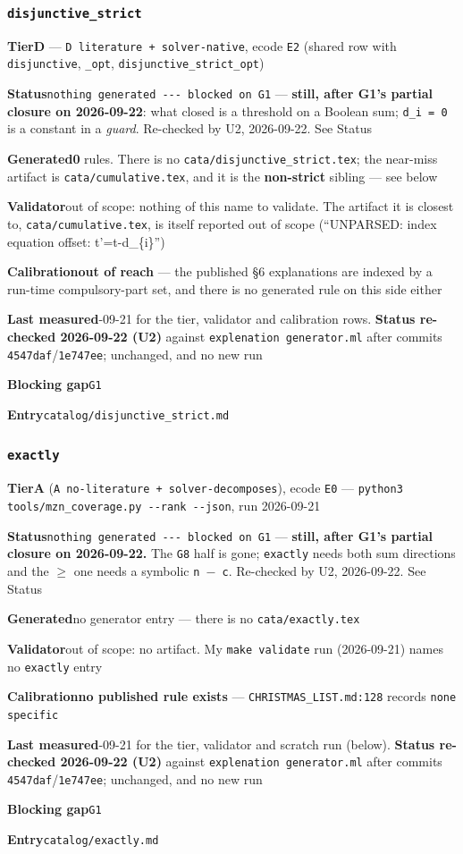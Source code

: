 \documentclass[10pt,a4paper]{article}
\newcommand{\entryfield}[2]{{\raggedright\textbf{#1}\quad #2\par}}
\begin{document}
\subsubsection*{\texttt{disjunctive\_\allowbreak{}strict}}
\label{entry:disjunctive-strict}
\entryfield{Tier}{\textbf{D} --- \texttt{D literature + solver-\allowbreak{}native}, ecode \texttt{E2} (shared row with \texttt{disjunctive}, \texttt{\_opt}, \texttt{disjunctive\_strict\_opt})}
\entryfield{Status}{\texttt{nothing generated -\allowbreak{}-\allowbreak{}-\allowbreak{} blocked on G1} --- \textbf{still, after G1's partial closure on 2026-09-22}: what closed is a threshold on a Boolean sum; \texttt{d\_i = 0} is a constant in a \emph{guard}. Re-checked by U2, 2026-09-22. See Status}
\entryfield{Generated}{\textbf{0} rules. There is no \texttt{cata/\allowbreak{}disjunctive\_\allowbreak{}strict.\allowbreak{}tex}; the near-miss artifact is \texttt{cata/cumulative.tex}, and it is the \textbf{non-strict} sibling --- see below}
\entryfield{Validator}{out of scope: nothing of this name to validate. The artifact it is closest to, \texttt{cata/cumulative.tex}, is itself reported out of scope (``UNPARSED: index equation offset: t'=t-d\_\{i\}'')}
\entryfield{Calibration}{\textbf{out of reach} --- the published \S{}6 explanations are indexed by a run-time compulsory-part set, and there is no generated rule on this side either}
\entryfield{Last measured}{2026-09-21 for the tier, validator and calibration rows. \textbf{Status re-checked 2026-09-22 (U2)} against \texttt{explenation generator.ml} after commits \texttt{4547daf}/\texttt{1e747ee}; unchanged, and no new run}
\entryfield{Blocking gap}{\texttt{G1}}
\entryfield{Entry}{\texttt{catalog/disjunctive\_strict.md}}
\subsubsection*{\texttt{exactly}}
\label{entry:exactly}
\entryfield{Tier}{\textbf{A} (\texttt{A no-\allowbreak{}literature + solver-\allowbreak{}decomposes}), ecode \texttt{E0} --- \texttt{python3 tools/\allowbreak{}mzn\_\allowbreak{}coverage.\allowbreak{}py -\allowbreak{}-\allowbreak{}rank -\allowbreak{}-\allowbreak{}json}, run 2026-09-21}
\entryfield{Status}{\texttt{nothing generated -\allowbreak{}-\allowbreak{}-\allowbreak{} blocked on G1} --- \textbf{still, after G1's partial closure on 2026-09-22.} The \texttt{G8} half is gone; \texttt{exactly} needs both sum directions and the \texttt{$\geq$} one needs a symbolic \texttt{n $-$ c}. Re-checked by U2, 2026-09-22. See Status}
\entryfield{Generated}{no generator entry --- there is no \texttt{cata/exactly.tex}}
\entryfield{Validator}{out of scope: no artifact. My \texttt{make validate} run (2026-09-21) names no \texttt{exactly} entry}
\entryfield{Calibration}{\textbf{no published rule exists} --- \texttt{CHRISTMAS\_LIST.md:128} records \texttt{none specific}}
\entryfield{Last measured}{2026-09-21 for the tier, validator and scratch run (below). \textbf{Status re-checked 2026-09-22 (U2)} against \texttt{explenation generator.ml} after commits \texttt{4547daf}/\texttt{1e747ee}; unchanged, and no new run}
\entryfield{Blocking gap}{\texttt{G1}}
\entryfield{Entry}{\texttt{catalog/exactly.md}}
\end{document}
